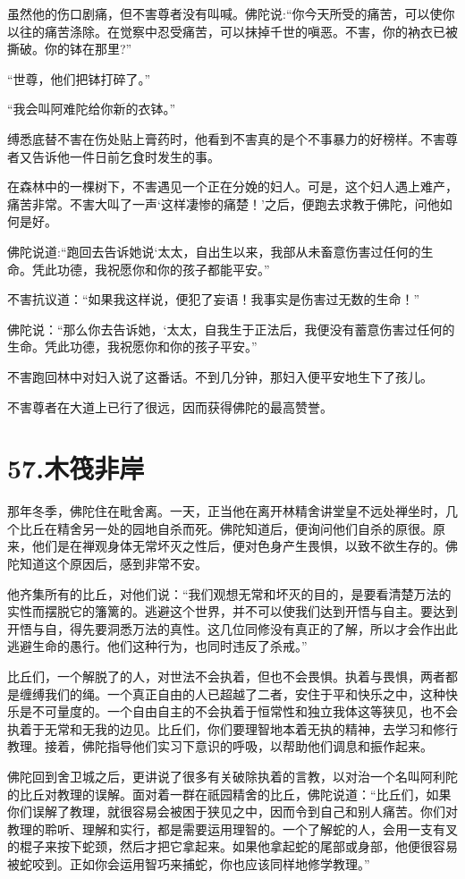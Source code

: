 \documentclass[12pt,twoside,openany]{book}
\begin{document}
虽然他的伤口剧痛，但不害尊者没有叫喊。佛陀说:“你今天所受的痛苦，可以使你以往的痛苦涤除。在觉察中忍受痛苦，可以抹掉千世的嗔恶。不害，你的衲衣已被撕破。你的钵在那里?”

“世尊，他们把钵打碎了。”

“我会叫阿难陀给你新的衣钵。”

缚悉底替不害在伤处贴上膏药时，他看到不害真的是个不事暴力的好榜样。不害尊者又告诉他一件日前乞食时发生的事。

在森林中的一棵树下，不害遇见一个正在分娩的妇人。可是，这个妇人遇上难产，痛苦非常。不害大叫了一声‘这样凄惨的痛楚！’之后，便跑去求教于佛陀，问他如何是好。

佛陀说道:“跑回去告诉她说‘太太，自出生以来，我部从未畜意伤害过任何的生命。凭此功德，我祝愿你和你的孩子都能平安。”

不害抗议道：“如果我这样说，便犯了妄语！我事实是伤害过无数的生命！”

佛陀说：“那么你去告诉她，‘太太，自我生于正法后，我便没有蓄意伤害过任何的生命。凭此功德，我祝愿你和你的孩子平安。”

不害跑回林中对妇入说了这番话。不到几分钟，那妇入便平安地生下了孩儿。

不害尊者在大道上已行了很远，因而获得佛陀的最高赞誉。


\chapter{57.木筏非岸}\label{ch57}

那年冬季，佛陀住在毗舍离。一天，正当他在离开林精舍讲堂皇不远处禅坐时，几个比丘在精舍另一处的园地自杀而死。佛陀知道后，便询问他们自杀的原很。原来，他们是在禅观身体无常坏灭之性后，便对色身产生畏惧，以致不欲生存的。佛陀知道这个原因后，感到非常不安。

他齐集所有的比丘，对他们说：“我们观想无常和坏灭的目的，是要看清楚万法的实性而摆脱它的籓篱的。逃避这个世界，并不可以使我们达到开悟与自主。要达到开悟与自，得先要洞悉万法的真性。这几位同修没有真正的了解，所以才会作出此逃避生命的愚行。他们这种行为，也同时违反了杀戒。”

比丘们，一个解脱了的人，对世法不会执着，但也不会畏惧。执着与畏惧，两者都是缠缚我们的绳。一个真正自由的人已超越了二者，安住于平和快乐之中，这种快乐是不可量度的。一个自由自主的不会执着于恒常性和独立我体这等狭见，也不会执着于无常和无我的边见。比丘们，你们要理智地本着无执的精神，去学习和修行教理。接着，佛陀指导他们实习下意识的呼吸，以帮助他们调息和振作起来。

佛陀回到舍卫城之后，更讲说了很多有关破除执着的言教，以对治一个名叫阿利陀的比丘对教理的误解。面对着一群在祇园精舍的比丘，佛陀说道：“比丘们，如果你们误解了教理，就很容易会被困于狭见之中，因而令到自己和别人痛苦。你们对教理的聆听、理解和实行，都是需要运用理智的。一个了解蛇的人，会用一支有叉的棍子来按下蛇颈，然后才把它拿起来。如果他拿起蛇的尾部或身部，他便很容易被蛇咬到。正如你会运用智巧来捕蛇，你也应该同样地修学教理。”
\end{document}
